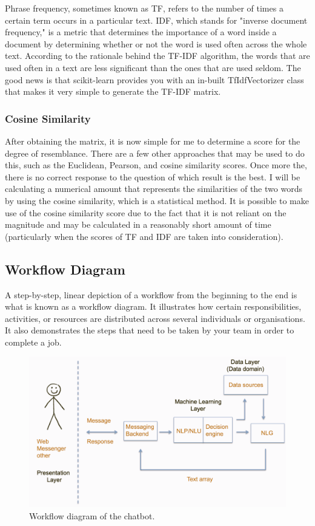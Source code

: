 Phrase frequency, sometimes known as TF, refers to the number of times a certain term occurs in a particular text. IDF, which stands for "inverse document frequency," is a metric that determines the importance of a word inside a document by determining whether or not the word is used often across the whole text. According to the rationale behind the TF-IDF algorithm, the words that are used often in a text are less significant than the ones that are used seldom. The good news is that scikit-learn provides you with an in-built TfIdfVectorizer class that makes it very simple to generate the TF-IDF matrix.

\subsubsection{Cosine Similarity}
After obtaining the matrix, it is now simple for me to determine a score for the degree of resemblance. There are a few other approaches that may be used to do this, such as the Euclidean, Pearson, and cosine similarity scores. Once more the, there is no correct response to the question of which result is the best. I will be calculating a numerical amount that represents the similarities of the two words by using the cosine similarity, which is a statistical method. It is possible to make use of the cosine similarity score due to the fact that it is not reliant on the magnitude and may be calculated in a reasonably short amount of time (particularly when the scores of TF and IDF are taken into consideration).

\subsection{Workflow Diagram}
A step-by-step, linear depiction of a workflow from the beginning to the end is what is known as a workflow diagram. It illustrates how certain responsibilities, activities, or resources are distributed across several individuals or organisations. It also demonstrates the steps that need to be taken by your team in order to complete a job.

\begin{figure}[!h]
	\centering
	\includegraphics[width=\linewidth]{chatbot}
	\caption{Workflow diagram of the chatbot.}
	\label{fig:5}
\end{figure}

